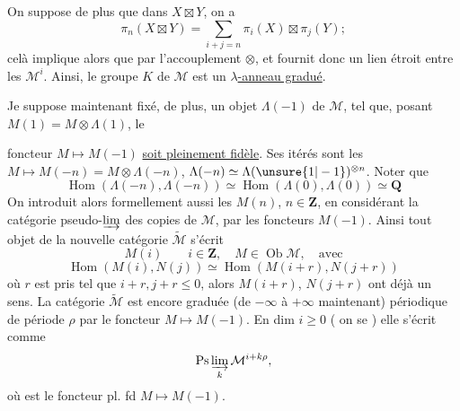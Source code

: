 On suppose de plus que dans $X\boxtimes Y$, on a
\[
\pi_n(X\boxtimes Y)=\sum_{i+j=n}\pi_i(X)\boxtimes\pi_j(Y);
\]
celà implique alors que
par l'accouplement $\otimes$, et fournit donc un lien étroit entre les $\mathcal M^i$. Ainsi, le groupe $K$ de $\mathcal M$ est un \uline{$\lambda$-anneau gradué}.

 Je suppose maintenant fixé, de plus, un objet  $\Lambda(-1)$ de $\mathcal M$, tel que, posant \deleted{\unsure{\Lambda}} $M(1)=M\otimes\Lambda(1)$,  le

foncteur $M\mapsto M(-1)$ \uline{soit pleinement fidèle}.
Ses itérés sont les $M\mapsto M(-n)=M\otimes\Lambda(-n)$, $\Lambda(-n)\simeq\Lambda(\unsure{1|-1})^{\otimes n}$.
Noter que
\[
\operatorname{Hom}(\Lambda(-n),\Lambda(-n))\simeq\operatorname{Hom}(\Lambda(0),\Lambda(0))\simeq\mathbf Q
\]
On introduit alors formellement aussi les $M(n)$, $n\in\mathbf Z$, en considérant la catégorie pseudo-$\varinjlim$ des copies de $\mathcal M$, par les foncteurs $M(-1)$. Ainsi tout objet de la nouvelle catégorie $\widetilde{\mathcal M}$  s'écrit
\[
M(i)\qquad i\in\mathbf Z,\quad M\in\operatorname{Ob}\mathcal M,\quad\text{avec}
\]
\[
\operatorname{Hom}(M(i),N(j))\simeq\operatorname{Hom}(M(i+r),N(j+r))
\]
où $r$ est pris tel que $i+r,j+r\leq0$, alors $M(i+r)$, $N(j+r)$ ont déjà un sens.
La catégorie $\widetilde{\mathcal M}$ est encore graduée (de $-\infty$ à $+\infty$ maintenant) périodique de période $\rho$ par le foncteur  $M\mapsto M(-1)$. En dim $i\geq0$ ( on se ) elle s'écrit comme
\[
\operatorname{Ps}\varinjlim_k\mathcal M^{i+k\rho},
\]
où
est le foncteur pl. fd $M\mapsto M(-1)$.

